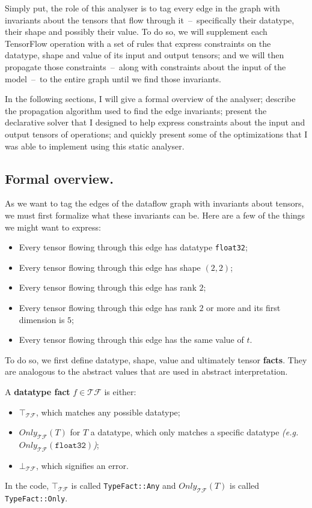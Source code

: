 \documentclass[11pt]{article}
\begin{document}
Simply put, the role of this analyser is to tag every edge in the graph with invariants about the tensors that flow through it~--~specifically their datatype, their shape and possibly their value. To do so, we will supplement each TensorFlow operation with a set of rules that express constraints on the datatype, shape and value of its input and output tensors; and we will then propagate those constraints~--~along with constraints about the input of the model~--~to the entire graph until we find those invariants.

In the following sections, I will give a formal overview of the analyser; describe the propagation algorithm used to find the edge invariants; present the declarative solver that I designed to help express constraints about the input and output tensors of operations; and quickly present some of the optimizations that I was able to implement using this static analyser.

\subsection{Formal overview.}

As we want to tag the edges of the dataflow graph with invariants about tensors, we must first formalize what these invariants can be. Here are a few of the things we might want to express:
\begin{itemize}[noitemsep]
    \item Every tensor flowing through this edge has datatype \texttt{float32};
    \item Every tensor flowing through this edge has shape $(2, 2)$;
    \item Every tensor flowing through this edge has rank $2$;
    \item Every tensor flowing through this edge has rank $2$ or more and its first dimension is $5$;
    \item Every tensor flowing through this edge has the same value of $t$.
\end{itemize}

To do so, we first define datatype, shape, value and ultimately tensor \textbf{facts}. They are analogous to the abstract values that are used in abstract interpretation.

\bigskip
\begin{definition}
A \textbf{datatype fact} $f \in \mathcal{TF}$ is either:
\begin{itemize}[noitemsep]
    \item $\top_\mathcal{TF}$, which matches any possible datatype;
    \item $Only_\mathcal{TF}(T)$ for $T$ a datatype, which only matches a specific datatype \textit{(e.g. $Only_\mathcal{TF}(\texttt{float32})$)};
    \item $\bot_\mathcal{TF}$, which signifies an error.
\end{itemize}

In the code, $\top_\mathcal{TF}$ is called \texttt{TypeFact::Any} and $Only_\mathcal{TF}(T)$ is called \texttt{TypeFact::Only}.\\
\end{definition}
\end{document}
